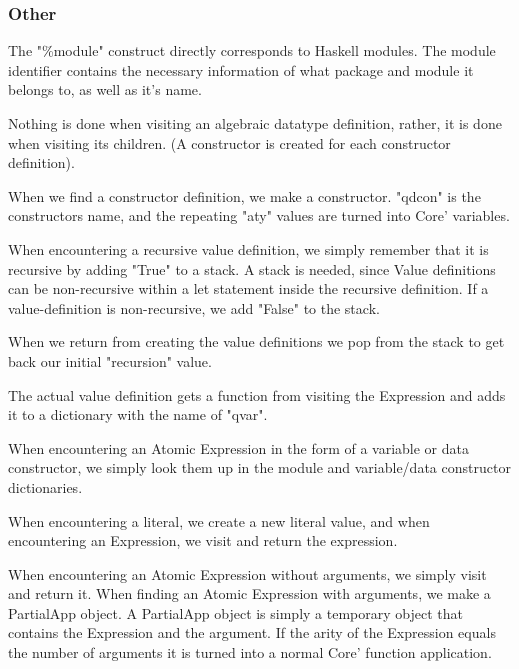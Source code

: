 \subsubsection*{Other}


The "\%module" construct directly corresponds to Haskell modules. The module identifier
contains the necessary information of what package and module it belongs to, as
well as it's name.


Nothing is done when visiting an algebraic datatype definition, rather, it is done when 
visiting its children. (A constructor is created for each constructor definition).


When we find a constructor definition, we make a constructor. "qdcon" is the 
constructors name, and the repeating "aty" values are turned into Core' variables.


When encountering a recursive value definition, we simply remember that it is
recursive by adding "True" to a stack. A stack is needed, since Value definitions
can be non-recursive within a let statement inside the recursive definition. If
a value-definition is non-recursive, we add "False" to the stack.

When we return from creating the value definitions we pop from the stack to get
back our initial "recursion" value.

The actual value definition gets a function from visiting the Expression and adds 
it to a dictionary with the name of "qvar".


When encountering an Atomic Expression in the form of a variable or data constructor, 
we simply look them up in the module and variable/data constructor dictionaries.

When encountering a literal, we create a new literal value, and when encountering an
Expression, we visit and return the expression.


When encountering an Atomic Expression without arguments, we simply visit and return
it. When finding an Atomic Expression with arguments, we make a PartialApp object.
A PartialApp object is simply a temporary object that contains the Expression and the
argument. If the arity of the Expression equals the number of arguments it is turned
into a normal Core' function application.

